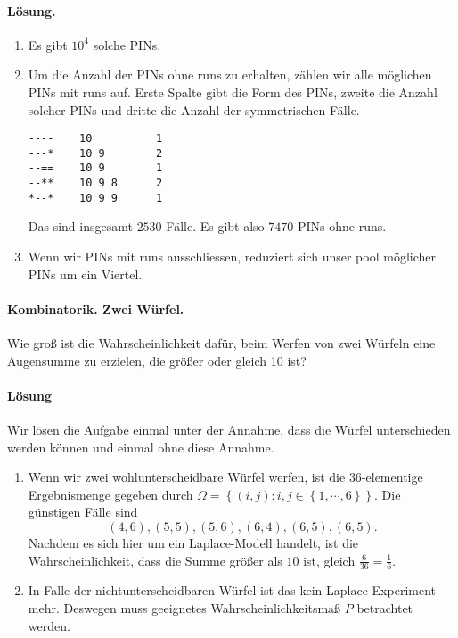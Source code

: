 \paragraph*{Lösung.}
\begin{enumerate}
    \item Es gibt $10^4$ solche PINs.
    \item Um die Anzahl der PINs ohne runs zu erhalten, zählen wir alle
        möglichen PINs mit runs auf. Erste Spalte gibt die Form des PINs,
        zweite die Anzahl solcher PINs und dritte die Anzahl der symmetrischen
        Fälle.
\begin{lstlisting}
----    10          1
---*    10 9        2
--==    10 9        1
--**    10 9 8      2
*--*    10 9 9      1
\end{lstlisting}
        Das sind insgesamt $2530$ Fälle. Es gibt also $7470$ PINs ohne runs.
    \item Wenn wir PINs mit runs ausschliessen, reduziert sich unser pool
        möglicher PINs um ein Viertel. 
\end{enumerate}


\paragraph{Kombinatorik. Zwei Würfel.}
Wie groß ist die Wahrscheinlichkeit dafür, beim Werfen von zwei Würfeln eine
Augensumme zu erzielen, die größer oder gleich 10 ist?

\paragraph*{Lösung} Wir lösen die Aufgabe einmal unter der Annahme, dass die Würfel
unterschieden werden können und einmal ohne diese Annahme. 
\begin{enumerate}
    \item Wenn wir zwei wohlunterscheidbare Würfel werfen, ist die
        $36$-elementige Ergebnismenge gegeben durch $\Omega = \left\{ (i,j) :
        i,j \in \left\{ 1, \cdots, 6 \right\} \right\}$. Die günstigen Fälle
        sind 
        \begin{equation}
            (4,6), (5,5), (5,6), (6,4), (6,5), (6,5).
        \end{equation}
        Nachdem es sich hier um ein Laplace-Modell handelt, ist die
        Wahrscheinlichkeit, dass die Summe größer als $10$ ist, gleich
        $\frac{6}{36}= \frac{1}{6}$.

    \item In Falle der nichtunterscheidbaren Würfel ist das kein
        Laplace-Experiment mehr. Deswegen muss geeignetes
        Wahrscheinlichkeitsmaß $P$ betrachtet werden. 
\end{enumerate}


